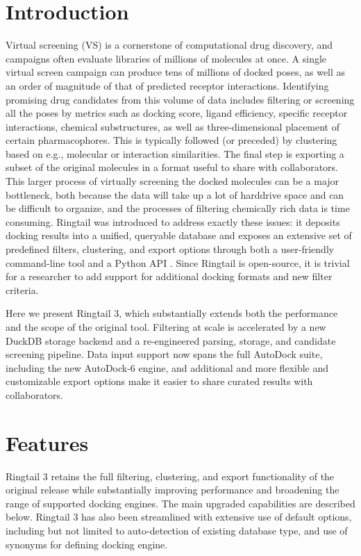 \documentclass[unnumsec,webpdf,contemporary,large]{oup-authoring-template}
\begin{document}
\section{Introduction}
Virtual screening (VS) is a cornerstone of computational drug discovery, and campaigns often evaluate libraries of millions of molecules at once. A single virtual screen campaign can produce tens of millions of docked poses, as well as an order of magnitude of that of predicted receptor interactions. Identifying promising drug candidates from this volume of data includes filtering or screening all the poses by metrics such as docking score, ligand efficiency, specific receptor interactions, chemical substructures, as well as three-dimensional placement of certain pharmacophores. This is typically followed (or preceded) by clustering based on e.g., molecular or interaction similarities. The final step is exporting a subset of the original molecules in a format useful to share with collaborators. This larger process of virtually screening the docked molecules can be a major bottleneck, both because the data will take up a lot of harddrive space and can be difficult to organize, and the processes of filtering chemically rich data is time consuming. Ringtail was introduced to address exactly these issues: it deposits docking results into a unified, queryable database and exposes an extensive set of predefined filters, clustering, and export options through both a user-friendly command-line tool and a Python API \citep{HanselHarris2023}. Since Ringtail is open-source, it is trivial for a researcher to add support for additional docking formats and new filter criteria. 

Here we present Ringtail 3, which substantially extends both the performance and the scope of the original tool. Filtering at scale is accelerated by a new DuckDB storage backend and a re-engineered parsing, storage, and candidate screening pipeline. Data input support now spans the full AutoDock suite, including the new AutoDock-6 engine, and additional and more flexible and customizable export options make it easier to share curated results with collaborators.

\section{Features}
Ringtail 3 retains the full filtering, clustering, and export functionality of the original release while substantially improving performance and broadening the range of supported docking engines. The main upgraded capabilities are described below. Ringtail 3 has also been streamlined with extensive use of default options, including but not limited to auto-detection of existing database type, and use of synonyms for defining docking engine. 
\end{document}
